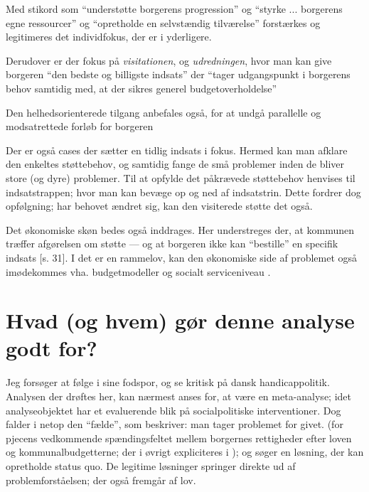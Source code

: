 Med stikord som “understøtte borgerens progression” og “styrke ... borgerens egne ressourcer” og “opretholde en selvstændig tilværelse” \autocite[s. 19]{klStyringAfDet2017} forstærkes og legitimeres det individfokus, der er i  yderligere.

Derudover er der fokus på \textit{visitationen}, og \textit{udredningen}, hvor man kan give borgeren “den bedste og billigste indsats” der “tager udgangspunkt i borgerens behov samtidig med, at der sikres generel budgetoverholdelse” \autocite[ss. 18, 28-30]{klStyringAfDet2017}

Den helhedsorienterede tilgang anbefales også, for at undgå parallelle og modsatrettede forløb for borgeren \autocite[ss. 34-35]{klStyringAfDet2017}

Der er også cases der sætter en tidlig indsats i fokus.
Hermed kan man afklare den enkeltes støttebehov, og samtidig fange de små problemer inden de bliver store (og dyre) problemer\autocite[ss 20-21]{klStyringAfDet2017}.
Til at opfylde det påkrævede støttebehov henvises til indsatstrappen; hvor man kan bevæge op og ned af indsatstrin.
Dette fordrer dog opfølgning; har behovet ændret sig, kan den visiterede støtte det også.

Det økonomiske skøn bedes også inddrages. Her understreges der, at kommunen træffer afgørelsen om støtte — og at borgeren ikke kan “bestille” en specifik indsats [s. 31].
I det  er en rammelov, kan den økonomiske side af problemet også imødekommes vha. budgetmodeller og socialt serviceniveau \autocite[ss. 36-37]{klStyringAfDet2017}.

\section{Hvad (og hvem) gør denne analyse godt for?}
Jeg forsøger at følge i  sine fodspor, og se kritisk på dansk handicappolitik.
Analysen der drøftes her, kan nærmest anses for, at være en meta-analyse; idet analyseobjektet har et evaluerende blik på socialpolitiske interventioner.
Dog falder  i netop den “fælde”, som \citeauthor{scheurichPolicyArchaeologyNew1994} beskriver: man tager problemet for givet. (for pjecens vedkommende spændingsfeltet mellem borgernes rettigheder efter loven og kommunalbudgetterne; der i øvrigt expliciteres i ); og søger en løsning, der kan opretholde status quo.
De legitime løsninger springer direkte ud af problemforståelsen; der også fremgår af lov.
